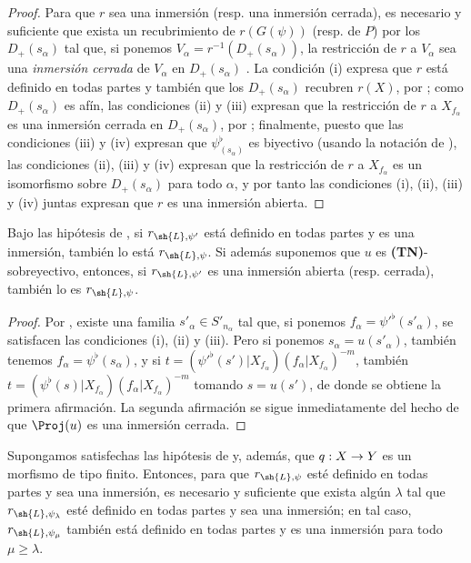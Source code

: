 \documentclass[oneside,10pt]{amsart}
\makeatletter
\renewcommand{\geq}{\geqslant}
\newcommand{\ega@arrow}[2]{\mathchoice{#1}{#2}{#2}{#2}}
\renewcommand{\to}{\ega@arrow{\longrightarrow}{\rightarrow}}
\let\EGAOriginalLabel\label
\renewcommand{\label}[1]{\phantomsection\EGAOriginalLabel{#1}}
\makeatother
\begin{document}
\begin{proof}
Para que $r$ sea una inmersión (resp. una inmersión cerrada), es necesario y suficiente que exista un recubrimiento de $r(G(\psi))$ (resp. de $P$) por los $D_+(s_\alpha)$ tal que, si ponemos $V_\alpha=r^{-1}(D_+(s_\alpha))$, la restricción de $r$ a $V_\alpha$ sea una \emph{inmersión cerrada} de $V_\alpha$ en $D_+(s_\alpha)$ .
La condición (i) expresa que $r$ está definido en todas partes y también que los $D_+(s_\alpha)$ recubren $r(X)$, por ;
como $D_+(s_\alpha)$ es afín, las condiciones (ii) y (iii) expresan que la restricción de $r$ a $X_{f_\alpha}$ es una inmersión cerrada en $D_+(s_\alpha)$, por ;
finalmente, puesto que las condiciones (iii) y (iv) expresan que $\psi_{(s_\alpha)}^\flat$ es biyectivo (usando la notación de ), las condiciones (ii), (iii) y (iv) expresan que la restricción de $r$ a $X_{f_\alpha}$ es un isomorfismo sobre $D_+(s_\alpha)$ para todo $\alpha$, y por tanto las condiciones (i), (ii), (iii) y (iv) juntas expresan que $r$ es una inmersión abierta.
\end{proof}

\begin{corollary}[3.8.3]
\label{II.3.8.3}
Bajo las hipótesis de , si $r_{\sh{L},\psi'}$ está definido en todas partes y es una inmersión, también lo está $r_{\sh{L},\psi}$.
Si además suponemos que $u$ es \textup{\textbf{(TN)}}-sobreyectivo, entonces, si $r_{\sh{L},\psi'}$ es una inmersión abierta \textup{(resp.} cerrada\textup{)}, también lo es $r_{\sh{L},\psi}$.
\end{corollary}

\begin{proof}
Por , existe una familia $s'_\alpha\in S'_{n_\alpha}$ tal que, si ponemos $f_\alpha=\psi'^\flat(s'_\alpha)$, se satisfacen las condiciones (i), (ii) y (iii).
Pero si ponemos $s_\alpha=u(s'_\alpha)$, también tenemos $f_\alpha=\psi^\flat(s_\alpha)$, y si $t=(\psi'^\flat(s')|X_{f_\alpha})(f_\alpha|X_{f_\alpha})^{-m}$, también $t=(\psi^\flat(s)|X_{f_\alpha})(f_\alpha|X_{f_\alpha})^{-m}$ tomando $s=u(s')$, de donde se obtiene la primera afirmación.
La segunda afirmación se sigue inmediatamente del hecho de que $\Proj(u)$ es una inmersión cerrada.
\end{proof}

\begin{proposition}[3.8.4]
\label{II.3.8.4}
Supongamos satisfechas las hipótesis de  y, además, que $q:X\to Y$ es un morfismo de tipo finito.
Entonces, para que $r_{\sh{L},\psi}$ esté definido en todas partes y sea una inmersión, es necesario y suficiente que exista algún $\lambda$ tal que $r_{\sh{L},\psi_\lambda}$ esté definido en todas partes y sea una inmersión;
en tal caso, $r_{\sh{L},\psi_\mu}$ también está definido en todas partes y es una inmersión para todo $\mu\geq\lambda$.
\end{proposition}
\end{document}
